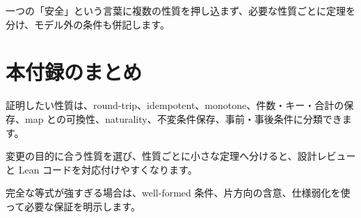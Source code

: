 一つの「安全」という言葉に複数の性質を押し込まず、必要な性質ごとに定理を分け、モデル外の条件も併記します。

\section{本付録のまとめ}

証明したい性質は、round-trip、idempotent、monotone、件数・キー・合計の保存、map との可換性、naturality、不変条件保存、事前・事後条件に分類できます。

変更の目的に合う性質を選び、性質ごとに小さな定理へ分けると、設計レビューと Lean コードを対応付けやすくなります。

完全な等式が強すぎる場合は、well-formed 条件、片方向の含意、仕様弱化を使って必要な保証を明示します。
